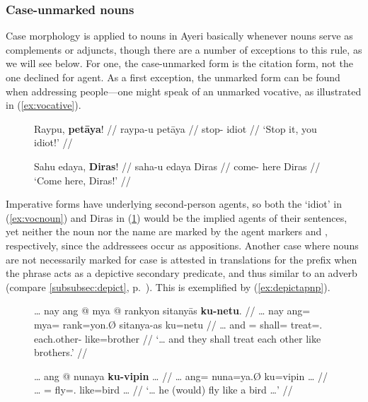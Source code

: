 
\subsubsection{Case-unmarked nouns}
\label{subsec:uncased}

Case morphology is applied to nouns in Ayeri basically whenever nouns serve as
complements or adjuncts, though there are a number of exceptions to this rule,
as we will see below. For one, the case-unmarked form is the citation form, not
the one declined for agent. As a first exception, the unmarked form can be
found when addressing people---one might speak of an unmarked vocative, as
illustrated in (\ref{ex:vocative}).

\begin{figure}[h]
\pex\label{ex:vocative}
\a\label{ex:vocnoun}\begingl
	\gla Raypu, \textbf{petāya}! //
	\glb raypa-u petāya //
	\glc stop-\Imp{} idiot //
	\glft `Stop it, you idiot!' //
\endgl

\a\label{ex:vocname}\begingl
	\gla Sahu edaya, \textbf{Diras}! //
	\glb saha-u edaya Diras //
	\glc come-\Imp{} here Diras //
	\glft `Come here, Diras!' //
\endgl
\xe
\end{figure}

Imperative forms have underlying second-person agents, so both the `idiot' in
(\ref{ex:vocnoun}) and Diras in (\ref{ex:vocname}) would be the implied agents
of their sentences, yet neither the noun nor the name are marked by the agent
markers  and , respectively, since the
addressees occur as appositions. Another case where nouns are not necessarily
marked for case is attested in translations for the prefix
 when the phrase acts as a depictive secondary
predicate, and thus similar to an adverb (compare \autoref{subsubsec:depict},
p.~\pageref{subsubsec:depict}). This is exemplified by
(\ref{ex:depictapnp}).

\begin{figure}[h]
\pex\label{ex:depictapnp}
\a\label{ex:kuudhr}\begingl
	\gla … nay ang @ mya @ rankyon sitanyās \textbf{ku-netu}. //
	\glb … nay ang= mya= rank=yon.Ø sitanya-as ku=netu //
	\glc … and \AgtT{}= shall= treat=\TplN{}.\Top{} 
		each.other-\Parg{} like=brother //
	\glft `… and they shall treat each other like brothers.'\footnotemark%
	//
\endgl

\a\label{ex:kukafka}\begingl
	\gla … ang @ nunaya \textbf{ku-vipin} … //
	\glb … ang= nuna=ya.Ø ku=vipin … //
	\glc … \AgtT{}= fly=\TsgM{}.\Top{} like=bird … //
	\glft `… he (would) fly like a bird …'%
	//
\endgl
\xe
\end{figure}

